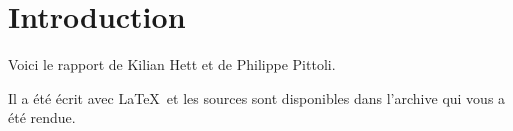 \chapter{Introduction}

Voici le rapport de Kilian Hett et de Philippe Pittoli.

Il a été écrit avec \LaTeX ~et les sources sont disponibles dans l'archive qui vous a été rendue.


\clearpage
